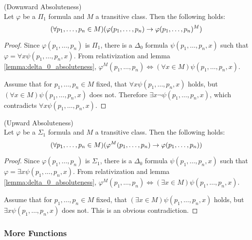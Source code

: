 \begin{lemma}{(Downward Absoluteness)}\label{lemma:downward_absoluteness}\\
Let $\varphi$ be a $\Pi_1$ formula and $M$ a transitive class. Then the following holds:
\begin{equation}
(\forall p_1, \ldots, p_n \in M)(\varphi(p_1, \ldots, p_n) \rightarrow \varphi(p_1, \ldots, p_n)^M)
\end{equation}
\end{lemma}
\begin{proof}
Since $\varphi(p_1, \ldots, p_n)$ is $\Pi_1$, there is a $\Delta_0$ formula $\psi(p_1, \ldots, p_n, x)$ such that $\varphi = \forall x \psi(p_1, \ldots, p_n, x)$. From relativization and lemma \ref{lemma:delta_0_absoluteness}, $\varphi^M(p_1, \ldots, p_n) \iff (\forall x \in M)\psi(p_1, \ldots, p_n, x)$.

Assume that for $p_1, \ldots, p_n \in M$ fixed, that $\forall x \psi(p_1, \ldots, p_n, x)$ holds, but $(\forall x \in M)\psi(p_1, \ldots, p_n, x)$ does not. 
Therefore $\exists x \neg \psi(p_1, \ldots, p_n, x)$, which contradicts $\forall x \psi(p_1, \ldots, p_n, x)$.
\end{proof}


\begin{lemma}{(Upward Absoluteness)}\label{lemma:upward_absoluteness}\\
Let $\varphi$ be a $\Sigma_1$ formula and $M$ a transitive class. Then the following holds:
\begin{equation}
(\forall p_1, \ldots, p_n \in M)(\varphi^M(p_1, \ldots, p_n) \rightarrow \varphi(p_1, \ldots, p_n))
\end{equation}
\end{lemma}
\begin{proof}
Since $\varphi(p_1, \ldots, p_n)$ is $\Sigma_1$, there is a $\Delta_0$ formula $\psi(p_1, \ldots, p_n, x)$ such that $\varphi = \exists x \psi(p_1, \ldots, p_n, x)$. From relativization and lemma \ref{lemma:delta_0_absoluteness}, $\varphi^M(p_1, \ldots, p_n) \iff (\exists x \in M)\psi(p_1, \ldots, p_n, x)$.

Assume that for $p_1, \ldots, p_n \in M$ fixed, that $(\exists x \in M)\psi(p_1, \ldots, p_n, x)$ holds, but $\exists x \psi(p_1, \ldots, p_n, x)$ does not. This is an obvious contradiction.
\end{proof}


\subsubsection{More Functions}

